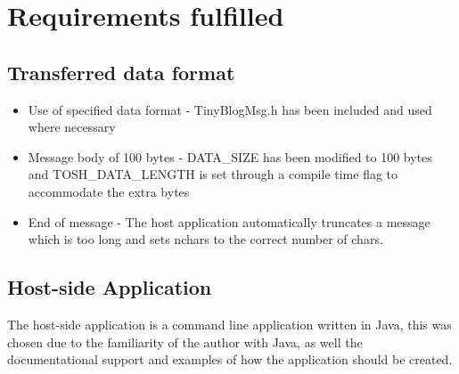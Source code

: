 \documentclass{article}
\begin{document}
\section{Requirements fulfilled}
\subsection{Transferred data format}
\begin{itemize}
	\item Use of specified data format - TinyBlogMsg.h has been included and used where necessary
	\item Message body of 100 bytes - DATA\_SIZE has been modified to 100 bytes and TOSH\_DATA\_LENGTH is set through a compile time flag to accommodate the extra bytes
	\item End of message - The host application automatically truncates a message which is too long and sets nchars to the correct number of chars.
\end{itemize}

\subsection{Host-side Application}
The host-side application is a command line application written in Java, this was chosen due to the familiarity of the author with Java, as well the documentational support and examples of how the application should be created.
\end{document}
